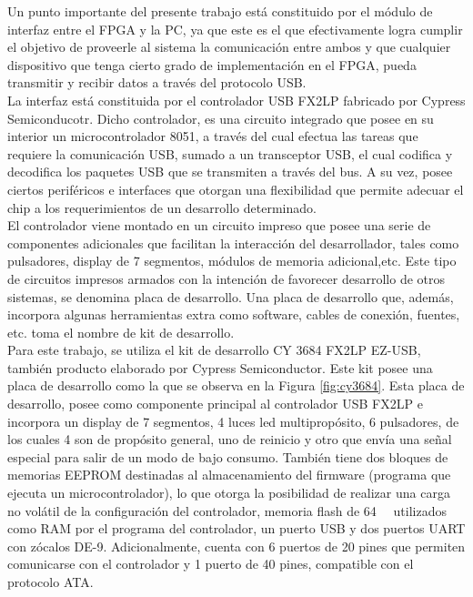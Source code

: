 	Un punto importante del presente trabajo está constituido por el módulo de interfaz entre el FPGA y la PC, ya que este es el que efectivamente logra cumplir el objetivo de proveerle al sistema la comunicación entre ambos y que cualquier dispositivo que tenga cierto grado de implementación en el FPGA, pueda transmitir y recibir datos a través del protocolo USB.\\
	
	La interfaz está constituida por el controlador USB FX2LP fabricado por Cypress Semiconducotr. Dicho controlador, es una circuito integrado que posee en su interior un microcontrolador 8051, a través del cual efectua las tareas que requiere la comunicación USB, sumado a un transceptor USB, el cual codifica y decodifica los paquetes USB que se transmiten a través del bus. A su vez, posee ciertos periféricos e interfaces que otorgan una flexibilidad que permite adecuar el chip a los requerimientos de un desarrollo determinado.\\
	
	El controlador viene montado en un circuito impreso que posee una serie de componentes adicionales que facilitan la interacción del desarrollador, tales como pulsadores, display de 7 segmentos, módulos de memoria adicional,etc. Este tipo de circuitos impresos armados con la intención de favorecer desarrollo de otros sistemas, se denomina placa de desarrollo. Una placa de desarrollo que, además, incorpora algunas herramientas extra como software, cables de conexión, fuentes, etc. toma el nombre de kit de desarrollo.\\
	
	Para este trabajo, se utiliza el kit de desarrollo CY 3684 FX2LP EZ-USB, también producto elaborado por Cypress Semiconductor. Este kit posee una placa de desarrollo como la que se observa en la Figura \ref{fig:cy3684}. Esta placa de desarrollo, posee como componente principal al controlador USB FX2LP e incorpora un display de 7 segmentos, 4 luces led multipropósito, 6 pulsadores, de los cuales 4 son de propósito general, uno de reinicio y otro que envía una señal especial para salir de un modo de bajo consumo. También tiene dos bloques de memorias EEPROM destinadas al almacenamiento del firmware (programa que ejecuta un microcontrolador), lo que otorga la posibilidad de realizar una carga no volátil de la configuración del controlador, memoria flash de \SI{64}{\kilo\byte} utilizados como RAM por el programa del controlador, un puerto USB y dos puertos UART con zócalos DE-9. Adicionalmente, cuenta con 6 puertos de 20 pines que permiten comunicarse con el controlador y 1 puerto de 40 pines, compatible con el protocolo ATA.\\
	

